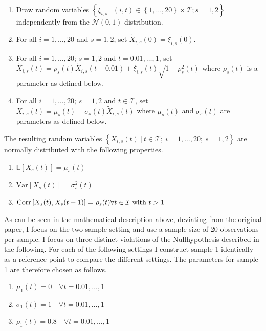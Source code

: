 \documentclass[12pt, a4paper]{article}
\theoremstyle{MAstyle} \newtheorem{assumption}{Assumption}[section]
\theoremstyle{MAstyle} \newtheorem{definition}{Definition}[section]
\theoremstyle{MAstyle} \newtheorem{theorem}{Theorem}[section]
\begin{document}
		\begin{enumerate}
			\item Draw random variables $\left\{\xi_{i,s} \ \vert \ (i,t) \in \left\{1, \dots, 20\right\} \times \mathcal{T} ; s = 1,2 \right\}$ independently from the $\mathcal{N}(0,1)$ distribution.
			\item For all $i = 1, \dots, 20$ and $s = 1,2$, set $\tilde{X}_{i,s}(0) = \xi_{i,s}(0)$.
			\item For all $i = 1, \dots, 20$; $s = 1,2$ and $t = 0.01, \dots, 1$, set $\tilde{X}_{i,s}(t) = \rho_{s}(t)\tilde{X}_{i,s}(t-0.01) + \xi_{i,s}(t)\sqrt{1-\rho_s^2(t)}$ where $\rho_{s}(t)$ is a parameter as defined below.
			\item For all $i = 1, \dots, 20$; $s = 1,2$ and $t \in \mathcal{T}$, set $X_{i,s}(t) = \mu_s(t) + \sigma_s(t)\tilde{X}_{i,s}(t)$ where $\mu_s(t)$ and $\sigma_s(t)$ are parameters as defined below.
		\end{enumerate}
		The resulting random variables $\left\{X_{i,s}(t) \ \vert \ t \in \mathcal{T}; \ i = 1, \dots, 20; \ s = 1,2\right\}$ are normally distributed with the following properties.
		\begin{multicols}{2}
			\begin{enumerate}
				\item $\mathbb{E}\left[X_s(t)\right] = \mu_s(t)$
				\item $\text{Var}\left[X_s(t)\right] = \sigma^2_s(t)$
				\item $\text{Corr}\left[X_s(t), X_s(t-1)\right] = \rho_s(t) \\ \forall t \in \mathcal{I} \ \text{with} \ t > 1$
			\end{enumerate}
		\end{multicols}
		As can be seen in the mathematical description above, deviating from the original paper, I focus on the two sample setting and use a sample size of 20 observations per sample. I focus on three distinct violations of the Nullhypothesis described in the following. For each of the following settings I construct sample 1 identically as a reference point to compare the different settings. The parameters for sample 1 are therefore chosen as follows.
		\begin{multicols}{2}
			\begin{enumerate}
				\item $\mu_1(t) = 0 \quad \forall t = 0.01, \dots, 1$
				\item $\sigma_1(t) = 1 \quad \forall t = 0.01, \dots, 1$
				\item $ \rho_1(t) = 0.8 \quad \forall t = 0.01, \dots, 1$
			\end{enumerate}
		\end{multicols}
\end{document}
